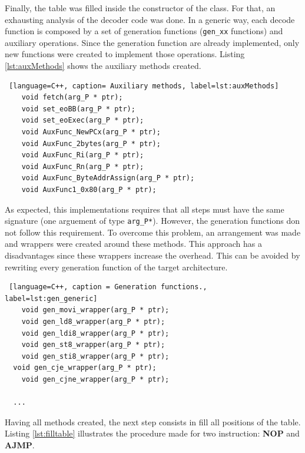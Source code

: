 Finally, the table was filled inside the constructor of the class. For that, an exhausting analysis of the decoder code was done. In a generic way, each decode function is composed by a set of generation functions (\texttt{gen\_xx} functions) and auxiliary operations. Since the generation function are already implemented, only new functions were created to implement those operations. Listing \ref{lst:auxMethods} shows the auxiliary methods created.    

\begin{lstlisting} [language=C++, caption= Auxiliary methods, label=lst:auxMethods]
	void fetch(arg_P * ptr);
	void set_eoBB(arg_P * ptr);
	void set_eoExec(arg_P * ptr);
	void AuxFunc_NewPCx(arg_P * ptr);
	void AuxFunc_2bytes(arg_P * ptr);
	void AuxFunc_Ri(arg_P * ptr);
	void AuxFunc_Rn(arg_P * ptr);
	void AuxFunc_ByteAddrAssign(arg_P * ptr);
	void AuxFunc1_0x80(arg_P * ptr);
\end{lstlisting}

As expected, this implementations requires that all steps must have the same signature (one arguement of type \texttt{arg\_P*}). However, the generation functions don not follow this requirement. To overcome this problem, an arrangement was made and wrappers were created around these methods. This approach has a disadvantages since these wrappers increase the overhead. This can be avoided by rewriting every generation function of the target architecture.

\begin{lstlisting} [language=C++, caption = Generation functions., label=lst:gen_generic]
	void gen_movi_wrapper(arg_P * ptr);
	void gen_ld8_wrapper(arg_P * ptr);
	void gen_ldi8_wrapper(arg_P * ptr);
	void gen_st8_wrapper(arg_P * ptr);
	void gen_sti8_wrapper(arg_P * ptr);
  void gen_cje_wrapper(arg_P * ptr);
	void gen_cjne_wrapper(arg_P * ptr);
  
  ...
\end{lstlisting}

Having all methods created, the next step consists in fill all positions of the table. Listing \ref{lst:filltable} illustrates the procedure made for two instruction: \textbf{NOP} and \textbf{AJMP}.

